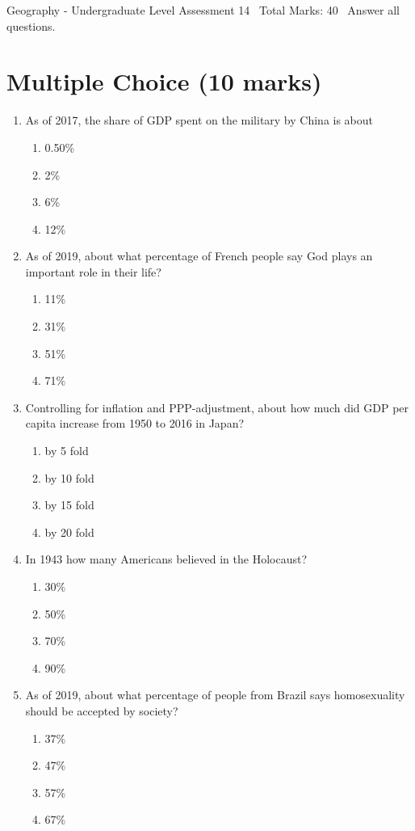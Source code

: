 \documentclass[12pt]{article}
\begin{document}
\begin{center}
Geography - Undergraduate Level Assessment 14 \
Total Marks: 40 \
Answer all questions.
\end{center}

\section*{Multiple Choice (10 marks)}
\begin{enumerate}[label=\arabic*.]
\item As of 2017, the share of GDP spent on the military by China is about
\begin{enumerate}[label=(\alph*)]
    \item 0.50\%
    \item 2\%
    \item 6\%
    \item 12\%
\end{enumerate}
\item As of 2019, about what percentage of French people say God plays an important role in their life?
\begin{enumerate}[label=(\alph*)]
    \item 11\%
    \item 31\%
    \item 51\%
    \item 71\%
\end{enumerate}
\item Controlling for inflation and PPP-adjustment, about how much did GDP per capita increase from 1950 to 2016 in Japan?
\begin{enumerate}[label=(\alph*)]
    \item by 5 fold
    \item by 10 fold
    \item by 15 fold
    \item by 20 fold
\end{enumerate}
\item In 1943 how many Americans believed in the Holocaust?
\begin{enumerate}[label=(\alph*)]
    \item 30\%
    \item 50\%
    \item 70\%
    \item 90\%
\end{enumerate}
\item As of 2019, about what percentage of people from Brazil says homosexuality should be accepted by society?
\begin{enumerate}[label=(\alph*)]
    \item 37\%
    \item 47\%
    \item 57\%
    \item 67\%
\end{enumerate}
\end{enumerate}
\end{document}
